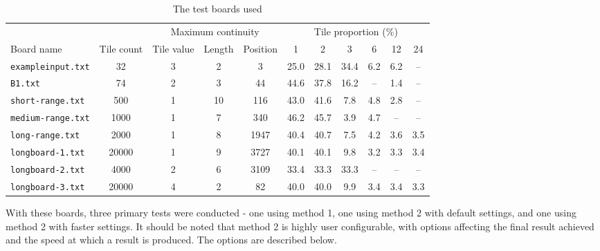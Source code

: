 \documentclass[a4paper, 11pt, titlepage]{report}
\begin{document}
\begin{table}[H]
  \centering
  \caption{The test boards used}
    \begin{tabular}{|l|c|ccc|cccccc|}
    \hline
          &       & \multicolumn{3}{c|}{Maximum continuity}  & \multicolumn{6}{c|}{Tile proportion (\%)} \\
    Board name & Tile count & Tile value & Length & Position & 1     & 2     & 3     & 6     & 12    & 24 \\
    \hline
    \texttt{exampleinput.txt} & 32    & 3     & 2     & 3     & 25.0  & 28.1  & 34.4  & 6.2   & 6.2   &  -- \\
    \texttt{B1.txt} & 74    & 2     & 3     & 44    & 44.6  & 37.8  & 16.2  & -- & 1.4   & --  \\
    \texttt{short-range.txt} & 500   & 1     & 10    & 116   & 43.0  & 41.6  & 7.8   & 4.8   & 2.8   & -- \\
    \texttt{medium-range.txt} & 1000  & 1     & 7     & 340   & 46.2  & 45.7  & 3.9   & 4.7   &  --     & -- \\
    \texttt{long-range.txt} & 2000  & 1     & 8     & 1947  & 40.4  & 40.7  & 7.5   & 4.2   & 3.6   & 3.5 \\
    \texttt{longboard-1.txt} & 20000 & 1     & 9     & 3727  & 40.1  & 40.1  & 9.8   & 3.2   & 3.3   & 3.4 \\
    \texttt{longboard-2.txt} & 4000  & 2     & 6     & 3109  & 33.4  & 33.3  & 33.3  &  --     &  --     & -- \\
    \texttt{longboard-3.txt} & 20000 & 4     & 2     & 82    & 40.0  & 40.0  & 9.9   & 3.4   & 3.4   & 3.3 \\
    \hline
    \end{tabular}%
  \label{tab:test-boards}%
\end{table}%

With these boards, three primary tests were conducted - one using method 1, one using method 2 with default settings, and one using method 2 with faster settings. It should be noted that method 2 is highly user configurable, with options affecting the final result achieved and the speed at which a result is produced. The options are described below.
\end{document}
